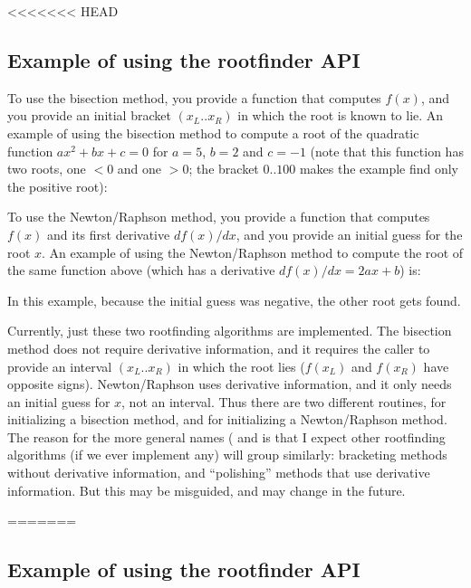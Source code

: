 <<<<<<< HEAD



\subsection{Example of using the rootfinder API}

To use the bisection method, you provide a function that computes
$f(x)$, and you provide an initial bracket $(x_L..x_R)$ in which the
root is known to lie.  An example of using the bisection method to
compute a root of the quadratic function $ax^2 + bx + c = 0$ for
$a=5$, $b=2$ and $c=-1$ (note that this function has two roots, one
$<0$ and one $>0$; the bracket $0..100$ makes the example find only
the positive root):




To use the Newton/Raphson method, you provide a function that computes
$f(x)$ and its first derivative $df(x)/dx$, and you provide an initial
guess for the root $x$. An example of using the Newton/Raphson method
to compute the root of the same function above (which has a derivative
$df(x)/dx = 2ax + b$) is:



In this example, because the initial guess was negative, the other
root gets found.

Currently, just these two rootfinding algorithms are implemented.  The
bisection method does not require derivative information, and it
requires the caller to provide an interval $(x_L..x_R)$ in which the
root lies ($f(x_L)$ and $f(x_R)$ have opposite signs). Newton/Raphson
uses derivative information, and it only needs an initial guess for
$x$, not an interval. Thus there are two different 
routines,  for initializing
a bisection method, and  for
initializing a Newton/Raphson method. The reason for the more general
names ( and  is that
I expect other rootfinding algorithms (if we ever implement any) will
group similarly: bracketing methods without derivative information,
and ``polishing'' methods that use derivative information. But this
may be misguided, and may change in the future.


=======



\subsection{Example of using the rootfinder API}

